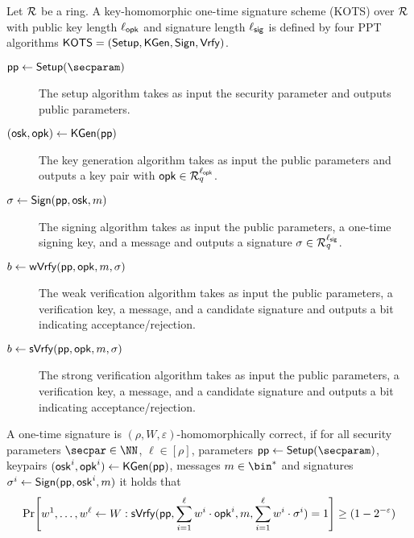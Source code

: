\begin{definition}\label{def:hots}
  Let $\mathcal{R}$ be a ring.
  A key-homomorphic one-time signature scheme (KOTS) over $\mathcal{R}$ with public key length ${\ell_{\mathsf{opk}}}$ and signature length ${\ell_{\mathsf{sig}}}$ is defined by four PPT algorithms $\mathsf{KOTS}=(\mathsf{Setup},\mathsf{KGen},\mathsf{Sign},\mathsf{Vrfy})$.
  \begin{description}
    \item[$\params\gets\setup(\secparam)$] The setup algorithm takes as input the security parameter and outputs public parameters.
    \item[$(\mathsf{osk},\mathsf{opk}) \gets \mathsf{KGen}(\mathsf{pp})$] The key generation algorithm takes as input the public parameters and outputs a key pair with $\mathsf{opk}\in\mathcal{R}_q^{\ell_{\mathsf{opk}}}$.
    \item[$\sigma \gets \mathsf{Sign}(\mathsf{pp},\mathsf{osk},m)$] The signing algorithm takes as input the public parameters, a one-time signing key, and a message and outputs a signature $\sigma\in\mathcal{R}_q^{\ell_{\mathsf{sig}}}$.
    \item[$b\gets \mathsf{wVrfy}(\mathsf{pp},\mathsf{opk},m,\sigma)$] The weak verification algorithm takes as input the public parameters, a verification key, a message, and a candidate signature and outputs a bit indicating acceptance/rejection.
    \item[$b\gets \mathsf{sVrfy}(\mathsf{pp},\mathsf{opk},m,\sigma)$] The strong verification algorithm takes as input the public parameters, a verification key, a message, and a candidate signature and outputs a bit indicating acceptance/rejection.
  \end{description}
  A one-time signature is $(\rho,W,\varepsilon)$-homomorphically correct, if 
  for all security parameters $\secpar\in\NN$, $\ell\in[\rho]$, parameters $\params \gets \setup(\secparam)$, keypairs $(\mathsf{osk}^i,\mathsf{opk}^i) \gets \mathsf{KGen}(\mathsf{pp})$, messages $m\in\bin^*$ and signatures $\sigma^i \gets \mathsf{Sign}(\mathsf{pp},\mathsf{osk}^i,m)$ it holds that
  \[
    \Pr\mleft[
      \begin{aligned}
      w^1,\dots,w^\ell\gets W
      \end{aligned}:
      \sverify(\params,\sum_{i=1}^{\ell}w^i\cdot\opk^i,m,\sum_{i=1}^{\ell}w^i\cdot\sigma^i) = 1
    \mright]\geq (1-2^{-\varepsilon})
  \]
\end{definition}

